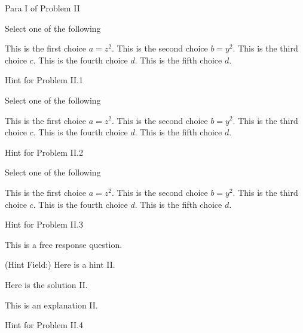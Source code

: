 \begin{mproblem}
\begin{gram}[200]
Para I of Problem II
\end{gram}


\begin{problem}[210][Problem II.1]
Select one of the following
\begin{xchoice}
\choice This is the first choice $a = z^2$.
\choice This is the second choice $b = y^2$.
\choice* This is the third choice $c$.
\choice* This is the fourth choice $d$.
\choice This is the fifth choice $d$.
\end{xchoice}
\help Hint  for Problem II.1
\end{problem}


\begin{problem}[220][Problem II.2]
Select one of the following
\begin{xchoice}
\choice This is the first choice $a = z^2$.
\choice This is the second choice $b = y^2$.
\choice* This is the third choice $c$.
\choice* This is the fourth choice $d$.
\choice This is the fifth choice $d$.
\end{xchoice}
\help 
Hint  for Problem II.2
\end{problem}

\begin{problem}[230][Problem II.3]
Select one of the following
\begin{xchoice}
\choice This is the first choice $a = z^2$.
\choice This is the second choice $b = y^2$.
\choice* This is the third choice $c$.
\choice* This is the fourth choice $d$.
\choice This is the fifth choice $d$.
\end{xchoice}

\help
Hint  for Problem II.3
\end{problem}


\begin{problem}[240][Problem II.4]
This is a free response question.

\help
(Hint Field:) Here is a hint II.

\solution
Here is the solution II.

\explain
This is an explanation II.

\help
Hint  for Problem II.4
\end{problem}


\end{mproblem}
